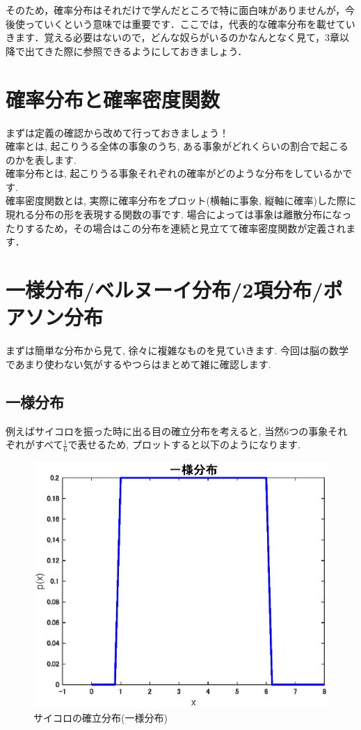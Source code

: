 \documentclass[11pt,a4paper,uplatex]{ujreport} 	%
\begin{document}
そのため，確率分布はそれだけで学んだところで特に面白味がありませんが，今後使っていくという意味では重要です．ここでは，代表的な確率分布を載せていきます．覚える必要はないので，どんな奴らがいるのかなんとなく見て，3章以降で出てきた際に参照できるようにしておきましょう．
\section{確率分布と確率密度関数}
まずは定義の確認から改めて行っておきましょう！\\

確率とは, 起こりうる全体の事象のうち, ある事象がどれくらいの割合で起こるのかを表します. \\

確率分布とは, 起こりうる事象それぞれの確率がどのような分布をしているかです. \\

確率密度関数とは, 実際に確率分布をプロット(横軸に事象, 縦軸に確率)した際に現れる分布の形を表現する関数の事です. 場合によっては事象は離散分布になったりするため，その場合はこの分布を連続と見立てて確率密度関数が定義されます．\\

\section{一様分布/ベルヌーイ分布/2項分布/ポアソン分布}
まずは簡単な分布から見て, 徐々に複雑なものを見ていきます. 今回は脳の数学であまり使わない気がするやつらはまとめて雑に確認します.\\
\subsection{一様分布}
例えばサイコロを振った時に出る目の確立分布を考えると, 当然6つの事象それぞれがすべて$\frac{1}{6}$で表せるため, プロットすると以下のようになります.\\


\begin{figure}[H]
\label{im:uniform}
  \centering
  \includegraphics[width=15cm]{../figures/uniform.eps}
  \caption{サイコロの確立分布(一様分布)}
\end{figure}
\end{document}
